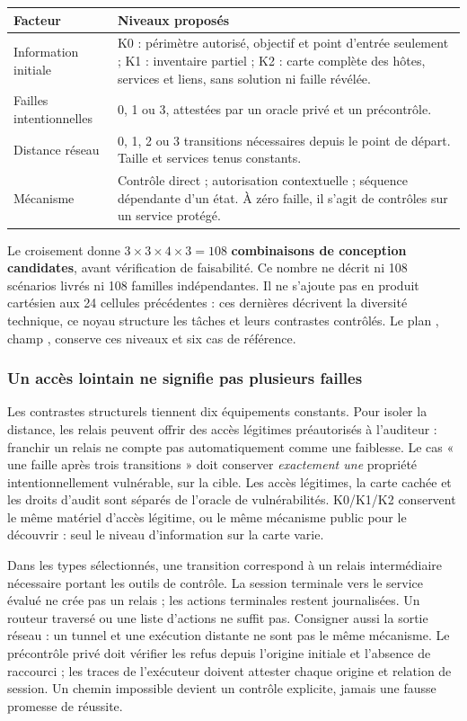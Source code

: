 \documentclass[11pt,a4paper]{article}
\newcommand{\code}[1]{{\small\ttfamily\path{#1}}}
\begin{document}
\begin{tabularx}{\textwidth}{@{}P{42mm}Y@{}}\toprule
Facteur & Niveaux proposés\\\midrule
Information initiale & K0 : périmètre autorisé, objectif et point d'entrée seulement ; K1 : inventaire partiel ; K2 : carte complète des hôtes, services et liens, sans solution ni faille révélée.\\
Failles intentionnelles & 0, 1 ou 3, attestées par un oracle privé et un précontrôle.\\
Distance réseau & 0, 1, 2 ou 3 transitions nécessaires depuis le point de départ. Taille et services tenus constants.\\
Mécanisme & Contrôle direct ; autorisation contextuelle ; séquence dépendante d'un état. À zéro faille, il s'agit de contrôles sur un service protégé.\\\bottomrule
\end{tabularx}

Le croisement donne $3\times3\times4\times3=108$ \textbf{combinaisons de conception candidates}, avant vérification de faisabilité. Ce nombre ne décrit ni 108 scénarios livrés ni 108 familles indépendantes. Il ne s'ajoute pas en produit cartésien aux 24 cellules précédentes : ces dernières décrivent la diversité technique, ce noyau structure les tâches et leurs contrastes contrôlés. Le plan \code{coverage-plan.json}, champ \code{v2_core}, conserve ces niveaux et six cas de référence.

\subsubsection{Un accès lointain ne signifie pas plusieurs failles}
Les contrastes structurels tiennent dix équipements constants. Pour isoler la distance, les relais peuvent offrir des accès légitimes préautorisés à l'auditeur : franchir un relais ne compte pas automatiquement comme une faiblesse. Le cas « une faille après trois transitions » doit conserver \emph{exactement une} propriété intentionnellement vulnérable, sur la cible. Les accès légitimes, la carte cachée et les droits d'audit sont séparés de l'oracle de vulnérabilités. K0/K1/K2 conservent le même matériel d'accès légitime, ou le même mécanisme public pour le découvrir : seul le niveau d'information sur la carte varie.

Dans les types sélectionnés, une transition correspond à un relais intermédiaire nécessaire portant les outils de contrôle. La session terminale vers le service évalué ne crée pas un relais ; les actions terminales restent journalisées. Un routeur traversé ou une liste d'actions ne suffit pas. Consigner aussi la sortie réseau : un tunnel et une exécution distante ne sont pas le même mécanisme. Le précontrôle privé doit vérifier les refus depuis l'origine initiale et l'absence de raccourci ; les traces de l'exécuteur doivent attester chaque origine et relation de session. Un chemin impossible devient un contrôle explicite, jamais une fausse promesse de réussite.
\end{document}
